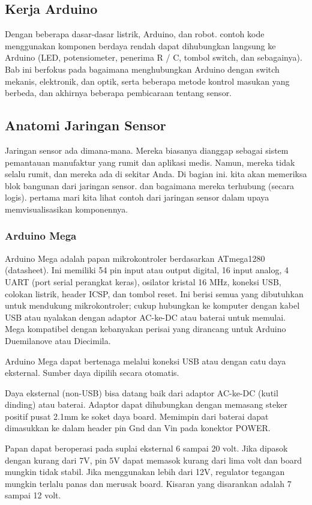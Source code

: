 \subsection{Kerja Arduino}
Dengan beberapa dasar-dasar listrik, Arduino, dan robot.
contoh kode menggunakan komponen berdaya rendah dapat dihubungkan langsung ke Arduino (LED, potensiometer, penerima R / C, tombol switch, dan sebagainya). 
Bab ini berfokus pada bagaimana menghubungkan Arduino dengan switch mekanis, elektronik, dan optik, serta beberapa metode kontrol masukan yang berbeda, dan akhirnya beberapa pembicaraan tentang sensor.

\subsection{Anatomi Jaringan Sensor}
Jaringan sensor ada dimana-mana. Mereka biasanya dianggap sebagai sistem pemantauan manufaktur yang rumit
dan aplikasi medis. Namun, mereka tidak selalu rumit, dan mereka ada di sekitar Anda.
Di bagian ini. kita akan memeriksa blok bangunan dari jaringan sensor. dan bagaimana mereka terhubung (secara logis).
pertama mari kita lihat contoh dari jaringan sensor dalam upaya memvisualisasikan komponennya.

\subsubsection{Arduino Mega}

Arduino Mega adalah papan mikrokontroler berdasarkan ATmega1280 (datasheet). Ini memiliki 54 pin input atau output digital, 16 input analog, 4 UART (port serial perangkat keras), osilator kristal 16 MHz, koneksi USB, colokan listrik, header ICSP, dan tombol reset. Ini berisi semua yang dibutuhkan untuk mendukung mikrokontroler; cukup hubungkan ke komputer dengan kabel USB atau nyalakan dengan adaptor AC-ke-DC atau baterai untuk memulai. Mega kompatibel dengan kebanyakan perisai yang dirancang untuk Arduino Duemilanove atau Diecimila.

Arduino Mega dapat bertenaga melalui koneksi USB atau dengan catu daya eksternal. Sumber daya dipilih secara otomatis.

Daya eksternal (non-USB) bisa datang baik dari adaptor AC-ke-DC (kutil dinding) atau baterai. Adaptor dapat dihubungkan dengan memasang steker positif pusat 2.1mm ke soket daya board. Memimpin dari baterai dapat dimasukkan ke dalam header pin Gnd dan Vin pada konektor POWER.

Papan dapat beroperasi pada suplai eksternal 6 sampai 20 volt. Jika dipasok dengan kurang dari 7V, pin 5V dapat memasok kurang dari lima volt dan board mungkin tidak stabil. Jika menggunakan lebih dari 12V, regulator tegangan mungkin terlalu panas dan merusak board. Kisaran yang disarankan adalah 7 sampai 12 volt.
